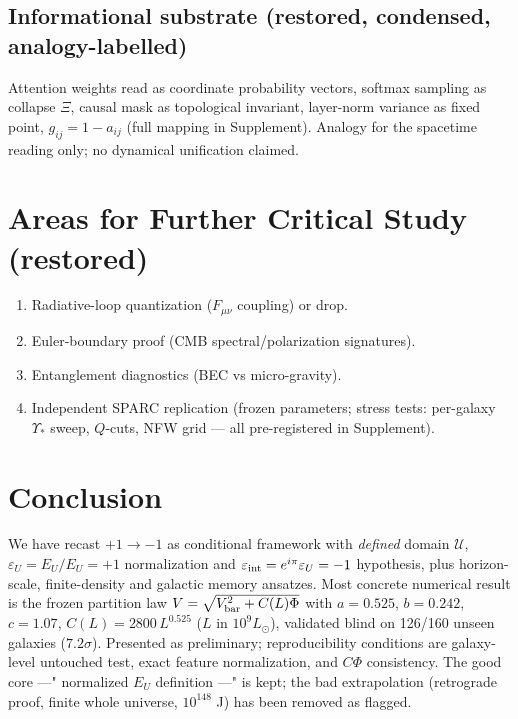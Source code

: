 \documentclass[twocolumn]{aastex631}
\begin{document}
\subsection{Informational substrate (restored, condensed, analogy-labelled)}
Attention weights read as coordinate probability vectors, softmax sampling as collapse $\Xi$, causal mask as topological invariant, layer-norm variance as fixed point, $g_{ij}=1-a_{ij}$ (full mapping in Supplement). Analogy for the spacetime reading only; no dynamical unification claimed.

\section{Areas for Further Critical Study (restored)}
\begin{enumerate}
\item Radiative-loop quantization ($F_{\mu\nu}$ coupling) or drop.
\item Euler-boundary proof (CMB spectral/polarization signatures).
\item Entanglement diagnostics (BEC vs micro-gravity).
\item Independent SPARC replication (frozen parameters; stress tests: per-galaxy $\Upsilon_*$ sweep, $Q$-cuts, NFW grid — all pre-registered in Supplement).
\end{enumerate}

\section{Conclusion}

We have recast $+1\to-1$ as conditional framework with \emph{defined} domain $\mathcal U$, $\varepsilon_{U}=E_{U}/E_{U}=+1$ normalization and $\varepsilon_{\rm int}=e^{i\pi}\varepsilon_{U}=-1$ hypothesis, plus horizon-scale, finite-density and galactic memory ansatzes. Most concrete numerical result is the frozen partition law $V=\sqrt{V_{\rm bar}^{2}+C(L)\Phi}$ with $a=0.525$, $b=0.242$, $c=1.07$, $C(L)=2800\,L^{0.525}$ ($L$ in $10^{9}L_{\odot}$), validated blind on 126/160 unseen galaxies ($7.2\sigma$). Presented as preliminary; reproducibility conditions are galaxy-level untouched test, exact feature normalization, and $C\Phi$ consistency. The good core ---" normalized $E_{U}$ definition ---" is kept; the bad extrapolation (retrograde proof, finite whole universe, $10^{148}$ J) has been removed as flagged.
\end{document}
